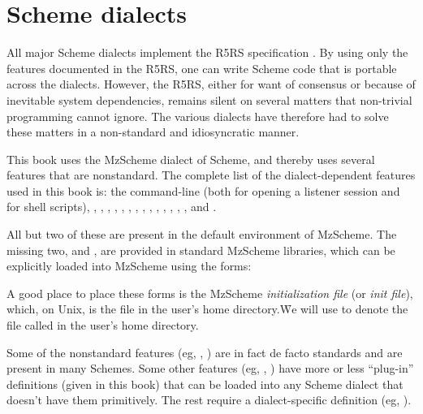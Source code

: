 \chapter{Scheme dialects}
\label{dialect}

All major Scheme dialects implement the R5RS
specification \cite{r5rs}.  By using only the features
documented in the R5RS, one can write Scheme code that
is portable across the dialects.  However, the R5RS,
either for want of consensus or because of inevitable
system dependencies, remains silent on several matters
that non-trivial programming cannot ignore.  The
various dialects have therefore had to solve these
matters in a non-standard and idiosyncratic manner.


This book uses the MzScheme \cite{mzscheme}
dialect of Scheme, and thereby uses several
features that are nonstandard.  The complete
list of the dialect-dependent features used
in this book is: the command-line (both for
opening a listener session and for shell scripts),
, , ,
, ,
, , ,
, ,
, , ,
,   and .

All but two of these  
are present in the default environment of MzScheme.  The missing two,
 and , are provided in
standard MzScheme libraries, which can be explicitly loaded into
MzScheme using the forms:


\n A good place to place these forms is the MzScheme
{\em initialization file} (or {\em init file}), which, on Unix, is the file
 in the user's home directory.\f{We will
use  to denote the file called
 in the user's home directory.}  

Some of the nonstandard features (eg, ,
) are in fact de facto standards and are present
in many Schemes.  Some other features (eg, ,
) have more or less ``plug-in'' definitions
(given in this book) that can be loaded into any Scheme
dialect that doesn't have them primitively.  The rest
require a dialect-specific definition
(eg, ).

